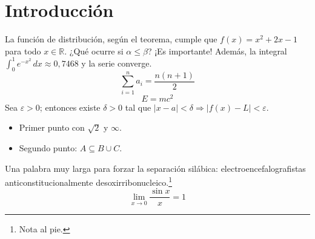 \documentclass{article}
\begin{document}
\section{Introducción}
La función de distribución, según el teorema, cumple que $f(x) = x^2 + 2x - 1$ para todo $x \in \mathbb{R}$. ¿Qué ocurre si $\alpha \leq \beta$? ¡Es importante!
Además, la integral $\int_0^1 e^{-x^2}\,dx \approx 0{,}7468$ y la serie converge.
\begin{equation}
\sum_{i=1}^{n} a_i = \frac{n(n+1)}{2}
\end{equation}
\begin{equation}
E = mc^2 \label{eq:e}
\end{equation}
Sea $\varepsilon > 0$; entonces existe $\delta > 0$ tal que $|x - a| < \delta \Rightarrow |f(x) - L| < \varepsilon$.
\begin{itemize}
\item Primer punto con $\sqrt{2}$ y $\infty$.
\item Segundo punto: $A \subseteq B \cup C$.
\end{itemize}
Una palabra muy larga para forzar la separación silábica: electroencefalografistas anticonstitucionalmente desoxirribonucleico.\footnote{Nota al pie.}
\[ \lim_{x \to 0} \frac{\sin x}{x} = 1 \]
\end{document}
